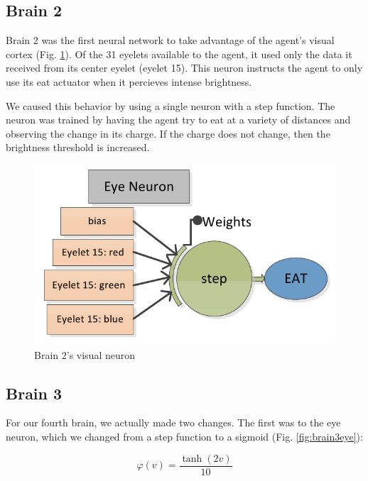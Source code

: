 \subsection{Brain 2}

Brain 2 was the first neural network to take advantage of the agent's visual
cortex (Fig. \ref{fig:brain2}). Of the 31 eyelets available to the agent, it 
used only the data it received from its center eyelet (eyelet 15). This
neuron instructs the agent to only use its eat actuator when it percieves
intense brightness. 

We caused this behavior by using a single neuron with a step function. 
The neuron was trained by having the agent try to eat at a variety of 
distances and observing the change in its charge. If the charge does not
change, then the brightness threshold is increased.

\begin{figure}
\begin{center}
  \includegraphics[scale=.3]{img/brain2.png}
  \caption{Brain 2's visual neuron}
  \label{fig:brain2}
\end{center}
\end{figure}

\subsection{Brain 3}

For our fourth brain, we actually made two changes. The first was to the
eye neuron, which we changed from a step function to a sigmoid 
(Fig. \ref{fig:brain3eye}):

\begin{equation} \label{eq:eyesig}
  \varphi(v) = \frac{\tanh(2v)}{10}
\end{equation}

